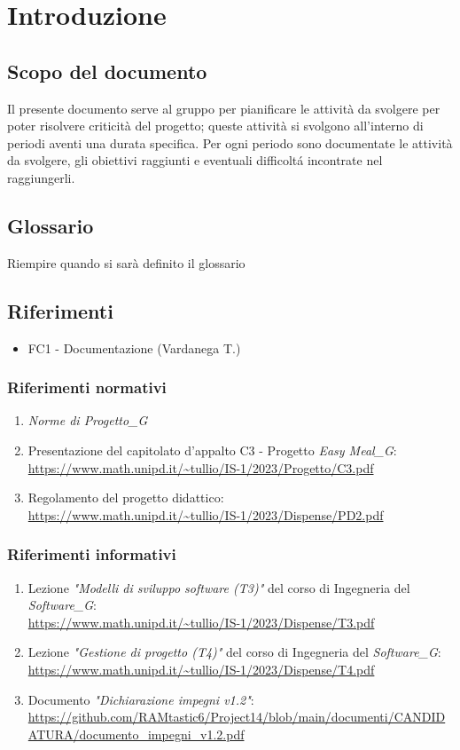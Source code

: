 \section{Introduzione}
\subsection{Scopo del documento}
Il presente documento serve al gruppo per pianificare le attività da svolgere per poter risolvere criticità del progetto; queste attività si svolgono all'interno di periodi aventi una durata specifica.
Per ogni periodo sono documentate le attività da svolgere, gli obiettivi raggiunti e eventuali difficoltá incontrate nel raggiungerli.
\subsection{Glossario}
Riempire quando si sarà definito il glossario 
\subsection{Riferimenti}
\begin{itemize}
    \item FC1 - Documentazione (Vardanega T.)
\end{itemize}

\subsubsection{Riferimenti normativi}
\begin{enumerate}
    \item \textit{Norme di Progetto_G}
    \item Presentazione del capitolato d'appalto C3 - Progetto \textit{Easy Meal_G}: \\ \url{https://www.math.unipd.it/~tullio/IS-1/2023/Progetto/C3.pdf}
    \item Regolamento del progetto didattico: \\ 
    \url{https://www.math.unipd.it/~tullio/IS-1/2023/Dispense/PD2.pdf}
\end{enumerate}
\subsubsection{Riferimenti informativi}
\label{sec:rif_inf}
\begin{enumerate}
    \item Lezione \emph{"Modelli di sviluppo software (T3)"} del corso di Ingegneria del \textit{Software_G}: \\
    \url{https://www.math.unipd.it/~tullio/IS-1/2023/Dispense/T3.pdf}
    \item Lezione \emph{"Gestione di progetto (T4)"} del corso di Ingegneria del \textit{Software_G}: \\
    \url{https://www.math.unipd.it/~tullio/IS-1/2023/Dispense/T4.pdf}
    \item Documento \emph{"Dichiarazione impegni v1.2"}: \\
    \url{https://github.com/RAMtastic6/Project14/blob/main/documenti/CANDIDATURA/documento_impegni_v1.2.pdf}
    
\end{enumerate}